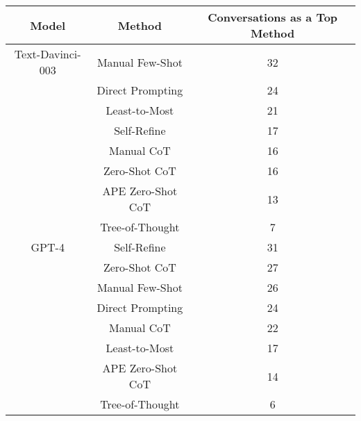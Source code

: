 \begin{tabular}{c c c}
\toprule
Model & Method & Conversations as a Top Method \\
\midrule
Text-Davinci-003 & Manual Few-Shot & 32 \\
 & Direct Prompting & 24 \\
 & Least-to-Most & 21 \\
 & Self-Refine & 17 \\
 & Manual CoT & 16 \\
 & Zero-Shot CoT & 16 \\
 & APE Zero-Shot CoT & 13 \\
 & Tree-of-Thought & 7 \\
GPT-4 & Self-Refine & 31 \\
 & Zero-Shot CoT & 27 \\
 & Manual Few-Shot & 26 \\
 & Direct Prompting & 24 \\
 & Manual CoT & 22 \\
 & Least-to-Most & 17 \\
 & APE Zero-Shot CoT & 14 \\
 & Tree-of-Thought & 6 \\
\bottomrule
\end{tabular}
